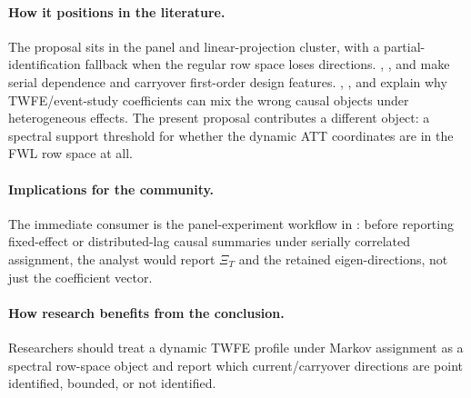 \documentclass[11pt]{article}
\theoremstyle{definition}
\theoremstyle{plain}
\theoremstyle{remark}
\begin{document}
\paragraph{How it positions in the literature.}
The proposal sits in the panel and linear-projection cluster, with a partial-identification fallback when the regular row space loses directions.
\citet{bojinov2021panel}, \citet{bojinov2023switchback}, and \citet{hu2022switchback} make serial dependence and carryover first-order design features.
\citet{sunabraham2021eventstudy}, \citet{dechaisemartin2020twfe}, and \citet{goodmanbacon2021timing} explain why TWFE/event-study coefficients can mix the wrong causal objects under heterogeneous effects.
The present proposal contributes a different object: a spectral support threshold for whether the dynamic ATT coordinates are in the FWL row space at all.

\paragraph{Implications for the community.}
The immediate consumer is the panel-experiment workflow in \citet{bojinov2021panel}: before reporting fixed-effect or distributed-lag causal summaries under serially correlated assignment, the analyst would report \(\Xi_T\) and the retained eigen-directions, not just the coefficient vector.
\paragraph{How research benefits from the conclusion.}
Researchers should treat a dynamic TWFE profile under Markov assignment as a spectral row-space object and report which current/carryover directions are point identified, bounded, or not identified.
\end{document}
